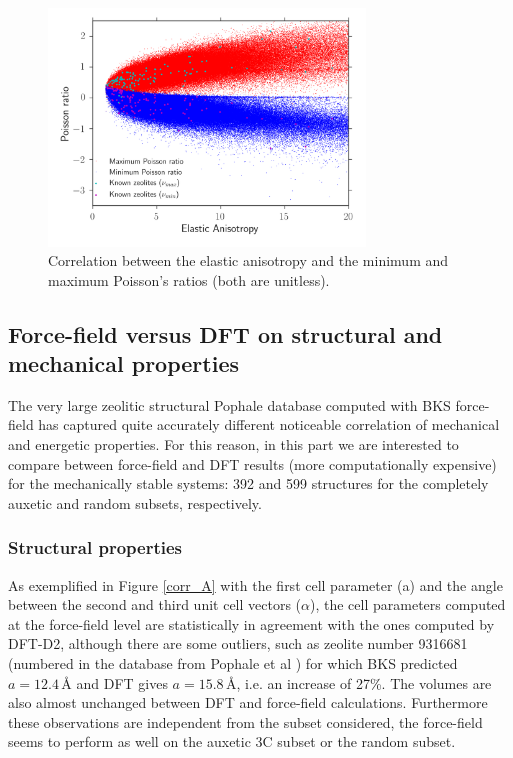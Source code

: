 \documentclass[journal=jacsat,manuscript=article]{achemso}
\begin{document}
\begin{figure}[H]\centering
\includegraphics[clip,trim=0cm 0.25cm 0cm 0.15cm,width=0.75\textwidth]{deem_database_20}
\caption{Correlation between the elastic anisotropy and the minimum and maximum Poisson's ratios (both are unitless).
\label{corr_An_Nu}}
\end{figure}
		


\subsection{Force-field versus DFT on structural and mechanical properties}

The very large zeolitic structural Pophale database computed with BKS force-field has captured quite accurately different noticeable correlation of mechanical and energetic properties. For this reason, in this part we are interested to compare between force-field and DFT results (more computationally expensive) for the mechanically stable systems: 392 and 599 structures for the completely auxetic and random subsets, respectively. 

\subsubsection{Structural properties}

As exemplified in Figure \ref{corr_A} with the first cell parameter (a) and the angle between the second and third unit cell vectors  ($\alpha$), the cell parameters computed at the force-field level are statistically in agreement with the ones computed by DFT-D2, although there are some outliers, such as zeolite number 9316681 (numbered in the database from Pophale et al \cite{Pophale2011}) for which BKS predicted $a = 12.4$\,{\AA} and DFT gives $a = 15.8$\,{\AA}, i.e. an increase of 27\%. The volumes are also almost unchanged between DFT and force-field calculations. Furthermore these observations are independent from the subset considered, the force-field seems to perform as well on the auxetic 3C subset or the random subset.
\end{document}
